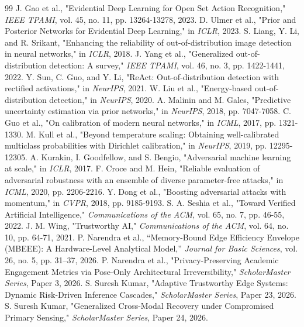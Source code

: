 \documentclass[conference]{IEEEtran}
\begin{document}
\begin{thebibliography}{99}
 J. Gao et al., "Evidential Deep Learning for Open Set Action Recognition," \textit{IEEE TPAMI}, vol. 45, no. 11, pp. 13264-13278, 2023.
 D. Ulmer et al., "Prior and Posterior Networks for Evidential Deep Learning," in \textit{ICLR}, 2023.
 S. Liang, Y. Li, and R. Srikant, "Enhancing the reliability of out-of-distribution image detection in neural networks," in \textit{ICLR}, 2018.
 J. Yang et al., "Generalized out-of-distribution detection: A survey," \textit{IEEE TPAMI}, vol. 46, no. 3, pp. 1422-1441, 2022.
 Y. Sun, C. Guo, and Y. Li, "ReAct: Out-of-distribution detection with rectified activations," in \textit{NeurIPS}, 2021.
 W. Liu et al., "Energy-based out-of-distribution detection," in \textit{NeurIPS}, 2020.
 A. Malinin and M. Gales, "Predictive uncertainty estimation via prior networks," in \textit{NeurIPS}, 2018, pp. 7047-7058.
 C. Guo et al., "On calibration of modern neural networks," in \textit{ICML}, 2017, pp. 1321-1330.
 M. Kull et al., "Beyond temperature scaling: Obtaining well-calibrated multiclass probabilities with Dirichlet calibration," in \textit{NeurIPS}, 2019, pp. 12295-12305.
 A. Kurakin, I. Goodfellow, and S. Bengio, "Adversarial machine learning at scale," in \textit{ICLR}, 2017.
 F. Croce and M. Hein, "Reliable evaluation of adversarial robustness with an ensemble of diverse parameter-free attacks," in \textit{ICML}, 2020, pp. 2206-2216.
 Y. Dong et al., "Boosting adversarial attacks with momentum," in \textit{CVPR}, 2018, pp. 9185-9193.
 S. A. Seshia et al., "Toward Verified Artificial Intelligence," \textit{Communications of the ACM}, vol. 65, no. 7, pp. 46-55, 2022.
 J. M. Wing, "Trustworthy AI," \textit{Communications of the ACM}, vol. 64, no. 10, pp. 64-71, 2021.
 P. Narendra et al., ``Memory-Bound Edge Efficiency Envelope (MBEEE): A Hardware-Level Analytical Model,'' \textit{Journal for Basic Sciences}, vol. 26, no. 5, pp. 31--37, 2026.
 P. Narendra et al., "Privacy-Preserving Academic Engagement Metrics via Pose-Only Architectural Irreversibility," \textit{ScholarMaster Series}, Paper 3, 2026.
 S. Suresh Kumar, "Adaptive Trustworthy Edge Systems: Dynamic Risk-Driven Inference Cascades," \textit{ScholarMaster Series}, Paper 23, 2026.
 S. Suresh Kumar, "Generalized Cross-Modal Recovery under Compromised Primary Sensing," \textit{ScholarMaster Series}, Paper 24, 2026.
\end{thebibliography}
\end{document}
